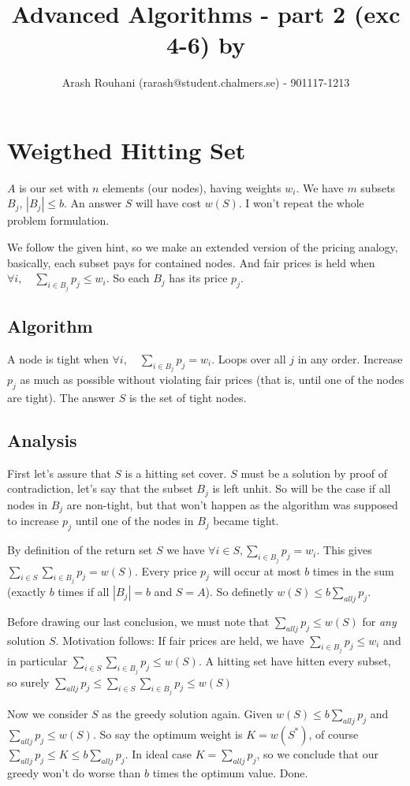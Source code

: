 \documentclass[a4paper,11pt]{article}
\title{Advanced Algorithms - part 2 (exc 4-6) by}
\author{Arash Rouhani (rarash@student.chalmers.se) - 901117-1213}
\begin{document}
\maketitle



\section{Weigthed Hitting Set}

$A$ is our set with $n$ elements (our nodes), having weights $w_i$.
We have $m$ subsets $B_j$, $|B_j| \leq b$. An answer $S$ will have cost $w(S)$.
I won't repeat the whole problem formulation.

We follow the given hint, so we make an extended version of
the pricing analogy, basically, each subset pays for contained nodes.
And fair prices is held when $\forall i, \quad \sum_{i \in B_j} p_j \leq w_i$.
So each $B_j$ has its price $p_j$.

\subsection{Algorithm}

A node is tight when $\forall i, \quad \sum_{i \in B_j} p_j = w_i$.
Loops over all $j$ in any order. Increase $p_j$ as much as possible
without violating fair prices (that is, until one of the nodes are tight).
The answer $S$ is the set of tight nodes.

\subsection{Analysis}

First let's assure that $S$ is a hitting set cover. $S$ must
be a solution by proof of contradiction, let's say that
the subset $B_j$ is left unhit. So will be the case if all nodes in
$B_j$ are non-tight, but that won't happen as the algorithm
was supposed to increase $p_j$ until one of the nodes in $B_j$
became tight.

By definition of the return set $S$ we have
$\forall i \in S, \sum_{i \in B_j} p_j = w_i$.
This gives $ \sum_{i \in S} \sum_{i \in B_j} p_j = w(S)$.
Every price $p_j$ will occur at most $b$ times in the sum
(exactly $b$ times if all $|B_j| = b$ and $S = A$).
So definetly $w(S) \leq b \sum_{all j} p_j$.

Before drawing our last conclusion, we must note that
$\sum_{all j} p_j \leq w(S) $ for \emph{any} solution $S$.
Motivation follows:
If fair prices are held, we have
$\sum_{i \in B_j} p_j \leq w_i$ and in particular
$\sum_{i \in S} \sum_{i \in B_j} p_j \leq w(S)$.
A hitting set have hitten every subset, so surely
$\sum_{all j} p_j \leq \sum_{i \in S} \sum_{i \in B_j} p_j \leq w(S)$

Now we consider $S$ as the greedy solution again.
Given $w(S) \leq b \sum_{all j} p_j$ and $\sum_{all j} p_j \leq w(S)$.
So say the optimum weight is $K=w(S^*)$, of course
$\sum_{all j} p_j \leq K \leq b \sum_{all j} p_j$.
In ideal case $K = \sum_{all j} p_j$,
so we conclude that our greedy won't do worse than $b$
times the optimum value. Done.
\end{document}
